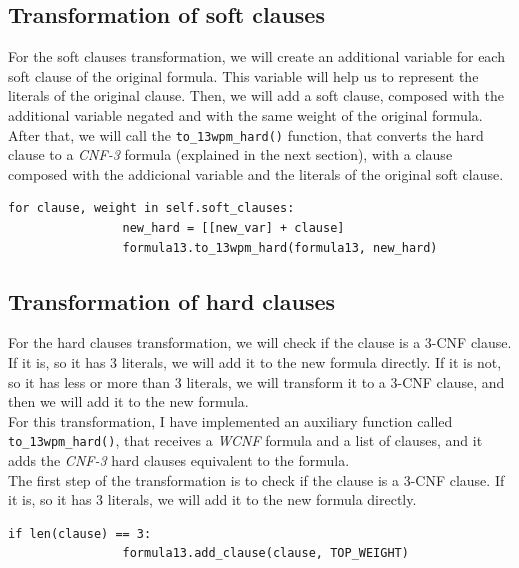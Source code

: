 \documentclass[11pt]{article}
\begin{document}
    \subsection{Transformation of soft clauses}
    \label{subsec:softclauses}
        For the soft clauses transformation, we will create an additional variable for each soft clause of the original formula.
        This variable will help us to represent the literals of the original clause.
        Then, we will add a soft clause, composed with the additional variable negated and with the same weight of the original formula.\\
        After that, we will call the \verb|to_13wpm_hard()| function, that converts the hard clause to a \textit{CNF-3} formula (explained in the next section), with a clause composed with the addicional variable and the literals of the original soft clause.\\
        \begin{lstlisting}[label={lst:lstlisting6}]
            for clause, weight in self.soft_clauses:
                new_hard = [[new_var] + clause]
                formula13.to_13wpm_hard(formula13, new_hard)
        \end{lstlisting}

    \subsection{Transformation of hard clauses}
    \label{subsec:hardclauses}
        For the hard clauses transformation, we will check if the clause is a 3-CNF clause.
        If it is, so it has 3 literals, we will add it to the new formula directly.
        If it is not, so it has less or more than 3 literals, we will transform it to a 3-CNF clause, and then we will add it to the new formula.\\

        For this transformation, I have implemented an auxiliary function called \verb|to_13wpm_hard()|, that receives a \textit{WCNF} formula and a list of clauses, and it adds the \textit{CNF-3} hard clauses equivalent to the formula.\\

        The first step of the transformation is to check if the clause is a 3-CNF clause.
        If it is, so it has 3 literals, we will add it to the new formula directly.\\
        \begin{lstlisting}[label={lst:lstlisting7}]
            if len(clause) == 3:
                formula13.add_clause(clause, TOP_WEIGHT)
        \end{lstlisting}
\end{document}
